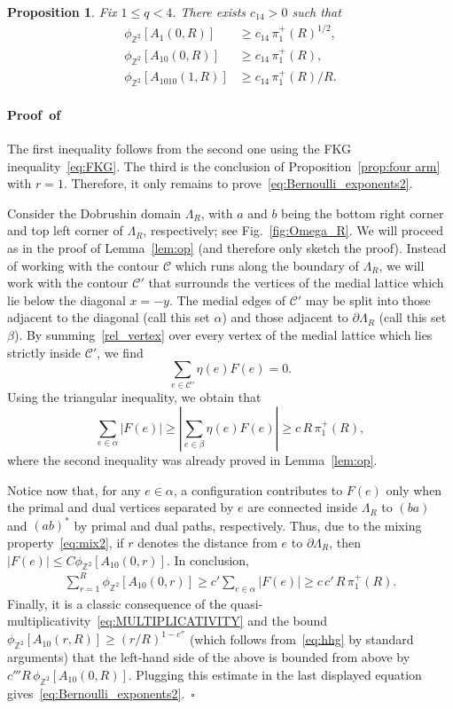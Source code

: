 \documentclass[a4paper,oneside,11pt]{article}
\newtheorem{proposition}[theorem]{Proposition}
\numberwithin{equation}{section}
\numberwithin{equation}{section}
\numberwithin{equation}{section}
\newenvironment{proof}[1][\relax]%
  {\paragraph{Proof\ifx#1\relax\else~of #1\fi}}%
  {~\hfill$\square$\par\bigskip}
\newcommand{\calC}{\mathcal{C}}
\newcommand{\bbZ}{\mathbb{Z}}
\newcommand{\La}{\Lambda}
\begin{document}
\begin{proposition}\label{lem:perco}	
    Fix $1\le q<4$. There exists $c_{14}>0$ such that
    \begin{align}
        \phi_{\bbZ^2}[A_1(0,R)] &\geq c_{14}\,\pi_1^+(R)^{1/2},\label{eq:Bernoulli_exponents1}\\
        \phi_{\bbZ^2}[A_{10}(0,R)] &\geq c_{14}\,\pi_1^+(R),\label{eq:Bernoulli_exponents2} \\
        \phi_{\bbZ^2}[A_{1010}(1,R)] &\geq c_{14}\,\pi_1^+(R)/R.\label{eq:Bernoulli_exponents4}
    \end{align}
\end{proposition}


\begin{proof}
	The first inequality follows from the second one using the FKG inequality~\eqref{eq:FKG}. 
	The third is the conclusion of Proposition~\ref{prop:four arm} with $r = 1$. 
	Therefore, it only remains to prove~\eqref{eq:Bernoulli_exponents2}.

	Consider the Dobrushin domain $\Lambda_R$, with $a$ and $b$ being the bottom right corner and top left corner of $\La_R$, respectively; see Fig.~\ref{fig:Omega_R}.
    We will proceed as in the proof of Lemma~\ref{lem:op} (and therefore only sketch the proof).
    Instead of working with the contour $\calC$ which runs along the boundary of $\La_R$, 
    we will work with the contour $\calC'$ that surrounds the vertices of the medial lattice which lie below the diagonal $x = -y$. 
    The medial edges of $\calC'$ may be split into those adjacent to the diagonal (call this set $\alpha$) and those adjacent to $\partial \La_R$ (call this set $\beta$).
    By summing~\eqref{rel_vertex} over every vertex of the medial lattice which lies strictly inside $\calC'$, we find
    $$\sum_{e\in \calC'}\eta(e)F(e)=0.$$
	Using the triangular inequality, we obtain that
    $$\sum_{e\in \alpha}|F(e)|\ge |\sum_{e\in \beta}\eta(e)F(e)| \geq  c\,R\,\pi_1^+(R),$$
    where the second inequality was already proved in Lemma~\ref{lem:op}.
    
    Notice now that, for any $e \in \alpha$, a configuration contributes to $F(e)$ only when the primal and dual vertices separated by $e$ are connected inside $\La_{R}$ 
    to $(ba)$ and $(ab)^*$ by primal and dual paths, respectively. 
    Thus, due to the mixing property~\eqref{eq:mix2}, if $r$ denotes the distance from $e$ to $\partial \La_R$, then $|F(e)|\leq C \phi_{\bbZ^2}[A_{10}(0,r)]$. 
	In conclusion, 
	\begin{align*}
		\sum_{r = 1}^R \phi_{\bbZ^2}[A_{10}(0,r)]\geq c' \sum_{e\in \alpha}|F(e)|\ge c\, c'\, R\,\pi_1^+(R).
	\end{align*}
	Finally, it is a classic consequence of the quasi-multiplicativity~\eqref{eq:MULTIPLICATIVITY}  and the bound $\phi_{\bbZ^2}[A_{10}(r,R)]\ge (r/R)^{1-c''}$
	(which follows from~\eqref{eq:hhg} by standard arguments)
	that the left-hand side of the above is bounded from above by $c''' R\,\phi_{\bbZ^2}[A_{10}(0,R)]$. 
	Plugging this estimate in the last displayed equation gives~\eqref{eq:Bernoulli_exponents2}.\end{proof}
\end{document}
